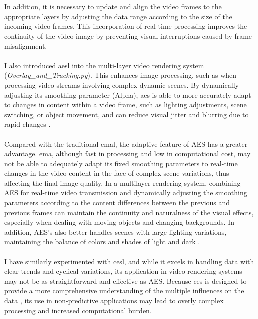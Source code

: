 \documentclass[12pt]{article}
\begin{document}
\begin{enumerate}
\begin{enumerate}
                        \\\\
                        In addition, it is necessary to update and align the video frames to the appropriate layers by adjusting the data range according to the size of the incoming video frames. This incorporation of real-time processing improves the continuity of the video image by preventing visual interruptions caused by frame misalignment\cite{Wang}.
                        \\\\
                        I also introduced \gls{aesl} into the multi-layer video rendering system (\emph{Overlay\_and\_Tracking.py}). This enhances image processing, such as when processing video streams involving complex dynamic scenes\cite{7410724}. By dynamically adjusting its smoothing parameter (Alpha), \gls{aes} is able to more accurately adapt to changes in content within a video frame, such as lighting adjustments, scene switching, or object movement, and can reduce visual jitter and blurring due to rapid changes \cite{7410724}.
                        \\\\
                        Compared with the traditional \gls{emal}, the adaptive feature of AES has a greater advantage. \gls{ema}, although fast in processing and low in computational cost, may not be able to adequately adapt its fixed smoothing parameters to real-time changes in the video content in the face of complex scene variations, thus affecting the final image quality\cite{aes,aes2,InvestopediaEMA}.
                        In a multilayer rendering system, combining AES for real-time video transmission and dynamically adjusting the smoothing parameters according to the content differences between the previous and previous frames can maintain the continuity and naturalness of the visual effects, especially when dealing with moving objects and changing backgrounds. In addition, AES's also better handles scenes with large lighting variations, maintaining the balance of colors and shades of light and dark \cite{7298776}.
                        \\\\
                        I have similarly experimented with \gls{cesl}, and while it excels in handling data with clear trends and cyclical variations, its application in video rendering systems may not be as straightforward and effective as AES. Because \gls{ces} is designed to provide a more comprehensive understanding of the multiple influences on the data \cite{ComplexES2018,Complex}, its use in non-predictive applications may lead to overly complex processing and increased computational burden.

\end{enumerate}
\end{enumerate}
\end{document}
